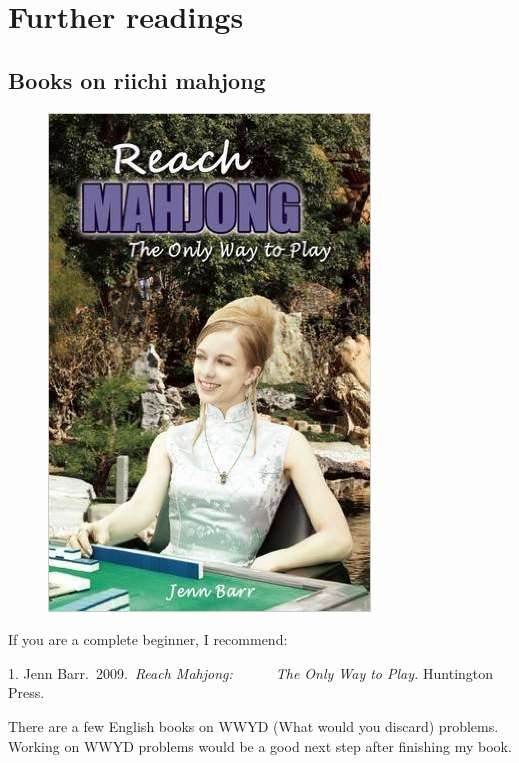 \chapter{Further readings} \label{ch:read}
\thispagestyle{empty}
\section{Books on riichi mahjong}
\begin{figure}
\vspace{-35pt}
\begin{center}
\includegraphics[width=.27\textwidth,clip]{figs/barr1}
\end{center}
\vspace{-50pt}
\end{figure}

\noindent If you are a complete beginner, I recommend:

\bigskip
\noindent \hspace{10pt}1. Jenn Barr.~2009.~\textit{Reach Mahjong:}\textit{~~~~~~The Only Way to Play.} Huntington Press.

\bigskip
\noindent There are a few English books on WWYD (What would you discard) problems. Working on WWYD problems would be a good next step after finishing my book.

